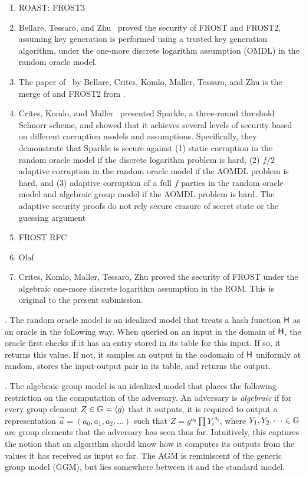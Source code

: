 \begin{enumerate}
\item ROAST: FROST3 
\item Bellare, Tessaro, and Zhu~\cite{BellareTZ22} proved the security of FROST and FROST2, assuming key generation is performed using a trusted key generation algorithm, under the one-more discrete logarithm assumption (OMDL) in the random oracle model.
\item The paper of~\cite{BellareCKMTZ22} by Bellare, Crites, Komlo, Maller, Tessaro, and Zhu is the merge of \cite{BellareTZ22} and FROST2 from \cite{CritesKM21}.
\item Crites, Komlo, and Maller~\cite{CritesKM23} presented Sparkle, a three-round threshold Schnorr scheme, and showed that it achieves several levels of security based on different corruption models and assumptions.  Specifically, they demonstrate that Sparkle is secure against (1) static corruption in the random oracle model if the discrete logarithm problem is hard, (2) $f/2$ adaptive corruption in the random oracle model if the AOMDL problem is hard, and (3) adaptive corruption of a full $f$ parties in the random oracle model and algebraic group model if the AOMDL problem is hard.  The adaptive security proofs do not rely secure erasure of secret state or the guessing argument 
\item FROST RFC
\item Olaf 
\item Crites, Komlo, Maller, Tessaro, Zhu proved the security of FROST under the algebraic one-more discrete logarithm assumption in the ROM.  This is original to the present submission.
\end{enumerate}

. The random oracle model is an idealized model that treats a hash function $\mathsf{H}$ as an oracle in the following way.  When queried on an input in the domain of $\mathsf{H}$, the oracle first checks if it has an entry stored in its table for this input.  If so, it returns this value.  If not, it samples an output in the codomain of $\mathsf{H}$ uniformly at random, stores the input-output pair in its table, and returns the output.

. The algebraic group model is an idealized model that places the following restriction on the computation of the adversary. An adversary is \emph{algebraic} if for every group element $Z \in \mathbb{G} = \langle g \rangle$ that it outputs, it is required to output a representation $\vec{a} = (a_0, a_1, a_2, \dots)$ such that $Z = g^{a_0} \prod {Y_i}^{a_i}$, where $Y_1, Y_2, \dots \in \mathbb{G}$ are group elements that the adversary has seen thus far.
Intuitively, this captures the notion that an algorithm should know how it computes its outputs from the values it has received as input so far.
The AGM is reminiscent of the generic group model (GGM), but lies somewhere between it and the standard model.

